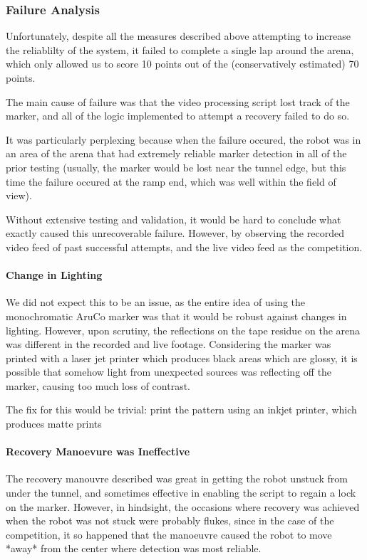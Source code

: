 \documentclass{article}
\begin{document}
\subsubsection{Failure Analysis}
Unfortunately, despite all the measures described above attempting to increase the reliablilty of the system, it failed to complete a single lap around the arena, which only allowed us to score 10 points out of the (conservatively estimated) 70 points.

The main cause of failure was that the video processing script lost track of the marker, and all of the logic implemented to attempt a recovery failed to do so.

It was particularly perplexing because when the failure occured, the robot was in an area of the arena that had extremely reliable marker detection in all of the prior testing (usually, the marker would be lost near the tunnel edge, but this time the failure occured at the ramp end, which was well within the field of view).

Without extensive testing and validation, it would be hard to conclude what exactly caused this unrecoverable failure. However, by observing the recorded video feed of past successful attempts, and the live video feed as the competition.

\paragraph{Change in Lighting}
We did not expect this to be an issue, as the entire idea of using the monochromatic AruCo marker was that it would be robust against changes in lighting. However, upon scrutiny, the reflections on the tape residue on the arena was different in the recorded and live footage. Considering the marker was printed with a laser jet printer which produces black areas which are glossy, it is possible that somehow light from unexpected sources was reflecting off the marker, causing too much loss of contrast.

The fix for this would be trivial: print the pattern using an inkjet printer, which produces matte prints

\paragraph{Recovery Manoevure was Ineffective}

The recovery manouvre described was great in getting the robot unstuck from under the tunnel, and sometimes effective in enabling the script to regain a lock on the marker. However, in hindsight, the occasions where recovery was achieved when the robot was not stuck were probably flukes, since in the case of the competition, it so happened that the manoeuvre caused the robot to move *away* from the center where detection was most reliable.
\end{document}
